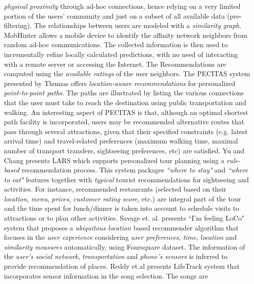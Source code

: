\textit{physical proximity} through ad-hoc connections, hence 
relying on a very limited portion of the users' community and just 
on a subset of all available data (pre-filtering). The relationships 
between users are modeled with a \textit{similarity graph}. MobHinter 
allows a mobile device to identify the affinity network neighbors 
from random ad-hoc communications. The collected information 
is then used to incrementally refine locally
calculated predictions, with no need of interacting with a remote
server or accessing the Internet. The Recommendations are computed
using the \textit{available ratings} of the user neighbors.
The PECITAS system \cite{tumas2009personalized} presented by Thumas 
offers \textit{location-aware recommendations} for personalized 
\textit{point-to-point  paths}. The paths are illustrated by listing 
the various connections that the user must take to reach the 
destination using public transportation and walking. An
interesting aspect of PECITAS is that, although an optimal shortest 
path facility is incorporated, users may be recommended alternative 
routes that pass through several attractions, given that
their specified constraints (e.g. latest arrival time) and travel-related 
preferences (maximum walking time, maximal number of transport
transfers, sightseeing preferences, etc) are satisfied. 
Yu and Chang presents LARS \cite{yu2009personalized} 
which supports personalized tour planning using a \textit{rule-based} 
recommendation process. This system
packages \textit{``where to stay"} and \textit{``where to eat"} 
features together with \textit{typical} tourist recommendations 
for sightseeing and activities. For
instance, recommended restaurants (selected based on their 
\textit{location}, \textit{menu},  \textit{prices}, \textit{customer rating score}, 
etc.) are integral part of the tour and the time spent for 
lunch/dinner is taken into account to schedule visits to 
attractions or to plan other activities.
Savage et. al. presents  ``I'm feeling LoCo" system \cite{savage2012m}
that proposes a \textit{ubiquitous location­} based recommender algorithm
that focuses in the \textit{user experience} considering 
\textit{user preferences}, \textit{time}, \textit{location} and 
\textit{similarity measures} automatically, using Foursquare
dataset. The information of the \textit{user's social network},
\textit{transportation} and \textit{phone's sensors} is inferred to provide
recommendation of places.
Reddy et.al\cite{reddy2006lifetrak} presents LifeTrack system that
incorporates sensor information in the song selection. The songs are
